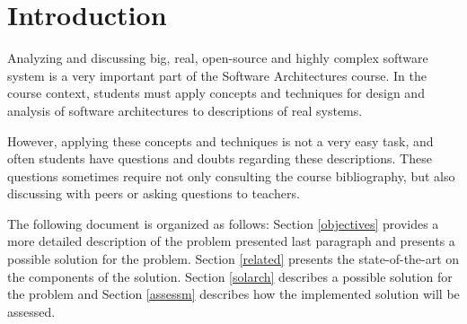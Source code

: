 
\chapter{Introduction}
\label{chapter:introduction}
Analyzing and discussing big, real, open-source and highly complex software system is a very important part of the Software Architectures course. In the course context, students must apply concepts and techniques for design and analysis of software architectures to descriptions of real systems. 

However, applying these concepts and techniques is not a very easy task, and often students have questions and doubts regarding these descriptions. These questions sometimes require not only consulting the course bibliography, but also discussing with peers or asking questions to teachers.

The following document is organized as follows: Section \ref{objectives} provides a more detailed description of the problem presented last paragraph and presents a possible solution for the problem. Section \ref{related} presents the state-of-the-art on the components of the solution. Section \ref{solarch} describes a possible solution for the problem and Section \ref{assessm} describes how the implemented solution will be assessed.
